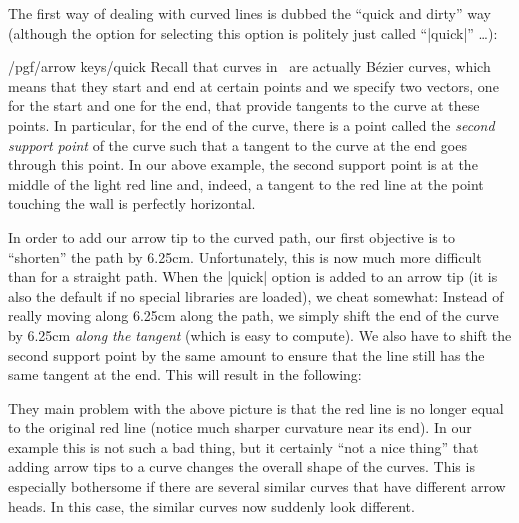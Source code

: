 \begin{codeexample}[]
\end{codeexample}

The first way of dealing with curved lines is dubbed the ``quick
and dirty'' way (although the option for selecting this option is
politely just called ``|quick|'' \dots):

\begin{key}{/pgf/arrow keys/quick}
  Recall that curves in \tikzname\ are actually B\'ezier curves, which
  means that they start and end at certain points and we specify two
  vectors, one for the start and one for the end, that provide
  tangents to the curve at these points. In particular, for the end of
  the curve, there is a point called the \emph{second support point}
  of the curve such that a tangent to the curve at the end goes
  through this point. In our above example, the second support point
  is at the middle of the light red line and, indeed, a tangent to the
  red line at the point touching the wall is perfectly horizontal.
  
  In order to add our arrow tip to the curved path, our first
  objective is to ``shorten'' the path by 6.25cm. Unfortunately, this
  is now much more difficult than for a straight path. When the
  |quick| option is added to an arrow tip (it is also
  the default if no special libraries are loaded), we cheat somewhat:
  Instead of really moving along 6.25cm along the path, we simply
  shift the end of the curve by 6.25cm \emph{along the tangent} (which
  is easy to compute). We also have to shift the second support point
  by the same amount to ensure that the line still has the same
  tangent at the end. This will result in the following:

\begin{codeexample}[]
\end{codeexample}

  They main problem with the above picture is that the red line is no
  longer equal to the original red line (notice much sharper curvature
  near its end). In our example this is not such a bad thing, but it
  certainly ``not a nice thing'' that adding arrow tips to a curve
  changes the overall shape of the curves. This is especially
  bothersome if there are several similar curves that have different
  arrow heads. In this case, the similar curves now suddenly look
  different.


\end{key}
